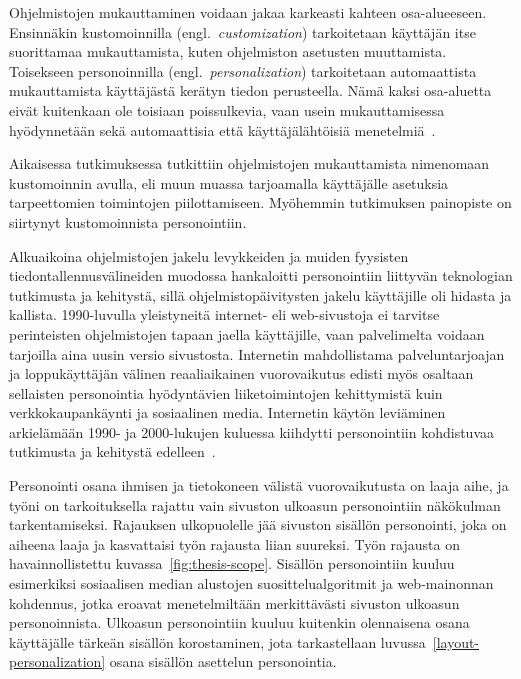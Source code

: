 \documentclass[finnish, 12pt, a4paper, elec, utf8, a-1b]{aaltothesis}
\begin{document}
Ohjelmistojen mukauttaminen voidaan jakaa karkeasti kahteen osa-alueeseen.
Ensinnäkin kustomoinnilla (engl.~\textit{customization}) tarkoitetaan käyttäjän
itse suorittamaa mukauttamista, kuten ohjelmiston asetusten muuttamista.
Toisekseen personoinnilla (engl.~\textit{personalization}) tarkoitetaan
automaattista mukauttamista käyttäjästä kerätyn tiedon perusteella. Nämä kaksi
osa-aluetta eivät kuitenkaan ole toisiaan poissulkevia, vaan usein
mukauttamisessa hyödynnetään sekä automaattisia että käyttäjälähtöisiä
menetelmiä~\cite{10.1145/633292.633483}.

Aikaisessa tutkimuksessa tutkittiin ohjelmistojen mukauttamista nimenomaan
kustomoinnin avulla, eli muun muassa tarjoamalla käyttäjälle asetuksia
tarpeettomien toimintojen piilottamiseen. Myöhemmin tutkimuksen painopiste on
siirtynyt kustomoinnista personointiin.

Alkuaikoina ohjelmistojen jakelu levykkeiden ja muiden fyysisten
tiedontallennusvälineiden muodossa hankaloitti personointiin liittyvän
teknologian tutkimusta ja kehitystä, sillä ohjelmistopäivitysten jakelu
käyttäjille oli hidasta ja kallista. 1990-luvulla yleistyneitä internet- eli
web-sivustoja ei tarvitse perinteisten ohjelmistojen tapaan jaella käyttäjille,
vaan palvelimelta voidaan tarjoilla aina uusin versio sivustosta. Internetin
mahdollistama palveluntarjoajan ja loppukäyttäjän välinen reaaliaikainen
vuorovaikutus edisti myös osaltaan sellaisten personointia hyödyntävien
liiketoimintojen kehittymistä kuin verkkokaupankäynti ja sosiaalinen media.
Internetin käytön leviäminen arkielämään 1990- ja 2000-lukujen kuluessa
kiihdytti personointiin kohdistuvaa tutkimusta ja kehitystä
edelleen~\cite{10.1108/03090560710737534}.

Personointi osana ihmisen ja tietokoneen välistä vuorovaikutusta on laaja aihe,
ja työni on tarkoituksella rajattu vain sivuston ulkoasun personointiin
näkökulman tarkentamiseksi. Rajauksen ulkopuolelle jää sivuston sisällön
personointi, joka on aiheena laaja ja kasvattaisi työn rajausta liian suureksi.
Työn rajausta on havainnollistettu kuvassa~\ref{fig:thesis-scope}. Sisällön
personointiin kuuluu esimerkiksi sosiaalisen median alustojen
suosittelualgoritmit ja web-mainonnan kohdennus, jotka eroavat menetelmiltään
merkittävästi sivuston ulkoasun personoinnista. Ulkoasun personointiin kuuluu
kuitenkin olennaisena osana käyttäjälle tärkeän sisällön korostaminen, jota
tarkastellaan luvussa~\ref{layout-personalization} osana sisällön asettelun
personointia.
\end{document}
